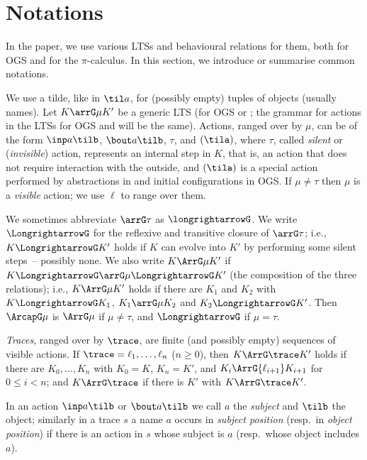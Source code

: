 \section{Notations}
\label{s:nota}

In the paper, we use various LTSs and behavioural relations for them, 
both for OGS and for the $\pi$-calculus.  
In this section, we introduce or summarise common notations. 

We use a tilde, like in $\til a$, for  (possibly empty) tuples of objects (usually names). 
Let $ K \arrG \mu K'$ be a generic LTS (for OGS or \piI; the grammar for actions in the
LTSs  for OGS
and \piI will be the same). 
Actions, ranged over by $\mu$,  can be of the form $\inp a \tilb$, $\bout a \tilb$,
$\tau$,  and $(\tila)$, where $\tau$, called \emph{silent} or (\emph{invisible}) action, 
represents an internal step in $K$, that is, an action that does not require interaction
with the outside,  and $(\tila)$ is  a special action performed by abstractions in \piI
and initial configurations in OGS.   If $\mu \neq \tau$ then $\mu$ is a \emph{visible} action; we use
$\ell$ to range over them.

We sometimes abbreviate $\arrG\tau$ as $ \longrightarrowG $.
We  write $ \LongrightarrowG$ for the reflexive and transitive closure of 
$\arrG\tau$;
i.e., $K
\LongrightarrowG K'
 $ holds if $K $ can evolve into $K'$ by performing some
silent steps~-- possibly none.
We also write 
$K \ArrG \mu K' $ if   $K \LongrightarrowG \arrG\mu \LongrightarrowG K' $ (the
composition of the three 
relations); i.e.,  
$K \ArrG \mu K'$ holds if there are $K_1 $ and $K_2$ with 
$K \LongrightarrowG K_1$, $K_1 \arrG\mu K_2$ 
and $K_2 \LongrightarrowG K'$.
Then $ \ArcapG \mu  $  is  $\ArrG \mu $ if $\mu\neq \tau$, and  
$\LongrightarrowG $ if $\mu=\tau$. 

 \emph{Traces}, ranged over by $\trace$,  are finite (and possibly empty) sequences of
 visible actions.
If $\trace =\ell_1, \ldots, \ell_n$ ($n\geq 0$), then  $K \ArrG \trace K'$  holds if there
are $K_0, \ldots, K_n$ with $K_0 = K$, $K_n =K'$, and $K_i \ArrG{\ell_{i+1}} K_{i+1}$  for
$0\leq i < n$; and    $K \ArrG \trace $ if there is $K' $ with $K \ArrG \trace  K'$. 

In an action $\inp a\tilb$ or $\bout a\tilb$ we call $a$ the \emph{subject} and
$\tilb$ the object; similarly in a trace $s$ a name $a$ occurs in \emph{subject position}
(resp.\ in \emph{object position})
if there is an action in $s$ whose subject is $a$ (resp.\ whose object includes $a$). 

